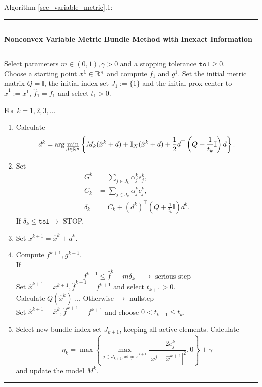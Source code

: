 \begin{minipage}\linewidth
Algorithm \ref{sec_variable_metric}.1:
\vspace{1em}
\hrule  \vspace{0.4ex} \hrule
\vspace{1ex}
\textbf{Nonconvex Variable Metric Bundle Method with Inexact Information}
\vspace{1ex}
\hrule
\vspace{1ex}
Select parameters \( m \in (0,1), \gamma > 0 \) and a stopping tolerance \( \mathtt{tol} \geq 0\). \\
Choose a starting point \(x^1 \in \mathbb{R}^n\) and compute \(f_1\) and \(g^1\). Set the initial metric matrix \(Q = \mathbb{I}\), the initial index set \(J_1:=\{1\}\) and the initial prox-center to \(\hat{x}^1 := x^1\), \(\hat{f}_1 = f_1\) and select \(t_1 > 0\).
\end{minipage}
For \(k = 1,2,3,  \dotsc \)   

\begin{enumerate}
	\item Calculate \[d^k = \arg \min_{d \in \mathbb{R}^n} \left\{ M_k(\hat{x}^k+d)+\mathbb{I}_X(\hat{x}^k+d)+\frac{1}{2}d^{\top}\left(Q+\frac{1}{t_k}\mathbb{I}\right)d\right\}.\]
	\item Set %
		\begin{align*} 
		  G^k &= \sum_{j \in J_k}{\alpha_j^k s_j^k}, \\ %
			C_k &= \sum_{j \in J_k}{\alpha_j^k c_j^k}, \\
	    \delta_k &=  C_k + (d^k)^{\top}\left(Q+\frac{1}{t_k}\mathbb{I}\right)d^k.
		\end{align*}
		If \(\delta_k \leq \mathtt{tol} \rightarrow \) STOP.
	\item Set \( x^{k+1} = \hat{x}^k + d^k \).
	\item Compute \(f^{k+1}, g^{k+1}\). \\
	If 
	\[f^{k+1} \leq \hat{f}^k - m\delta_k \quad \rightarrow \text{ serious step} \]
	Set \(\hat{x}^{k+1} = x^{k+1}, \hat{f}^{k+1} = f^{k+1}\) and select \(t_{k+1} > 0\). \\
	Calculate \(Q(\hat{x}^k)\) ...
	Otherwise \(\rightarrow\) nullstep \\
	Set \(\hat{x}^{k+1} = \hat{x}^k, \hat{f}^{k+1}=f^{k+1}\) and choose \(0 < t_{k+1} \leq t_k\). 	
	\item Select new bundle index set \(J_{k+1}\), keeping all active elements. Calculate 
	\[ \eta_k = \max{\left\{\max_{j \in J_{k+1}, x^j \neq \hat{x}^{k+1}}{\frac{-2e_j^k}{|x^j - \hat{x}^{k+1}|^2}, 0}\right\}}+\gamma  \]
	and update the model \(M^k\).
\end{enumerate}
\vspace{1ex}
\hrule

